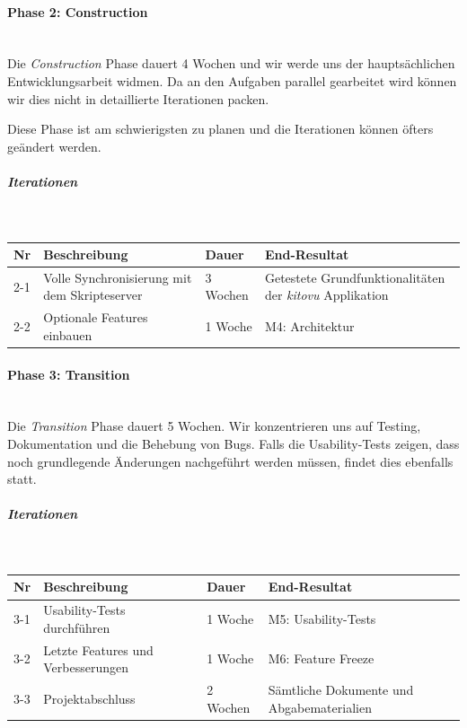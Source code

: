 \documentclass[a4paper]{article}
\begin{document}
\paragraph{Phase 2: Construction} \strut \\[-1em]

Die \emph{Construction} Phase dauert 4 Wochen und wir werde uns der hauptsächlichen Entwicklungsarbeit widmen.
Da an den Aufgaben parallel gearbeitet wird können wir dies nicht in detaillierte Iterationen packen.

Diese Phase ist am schwierigsten zu planen und die Iterationen können öfters geändert werden.

\subparagraph{Iterationen} \strut \\[-1em]

\begin{tabular}{l>{\raggedright}p{10.6em}l>{\raggedright\arraybackslash}p{20em}}
  \toprule
  Nr & Beschreibung & Dauer & End-Resultat \\
  \midrule
  2-1 & Volle Synchronisierung mit dem Skripteserver & 3 Wochen & Getestete Grundfunktionalitäten der \emph{kitovu} Applikation \\
  2-2 & Optionale Features einbauen & 1 Woche & M4: Architektur \\
  \bottomrule
\end{tabular}

\paragraph{Phase 3: Transition} \strut \\[-1em]

Die \emph{Transition} Phase dauert 5 Wochen.
Wir konzentrieren uns auf Testing, Dokumentation und die Behebung von Bugs. Falls die Usability-Tests zeigen, dass noch grundlegende Änderungen nachgeführt werden müssen, findet dies ebenfalls statt.

\subparagraph{Iterationen} \strut \\[-1em]

\begin{tabular}{l>{\raggedright}p{10.6em}l>{\raggedright\arraybackslash}p{20em}}
  \toprule
  Nr & Beschreibung & Dauer & End-Resultat \\
  \midrule
  3-1 & Usability-Tests durchführen & 1 Woche & M5: Usability-Tests \\
  3-2 & Letzte Features und Verbesserungen & 1 Woche & M6: Feature Freeze \\
  3-3 & Projektabschluss & 2 Wochen & Sämtliche Dokumente und Abgabematerialien \\
  \bottomrule
\end{tabular}
\end{document}

